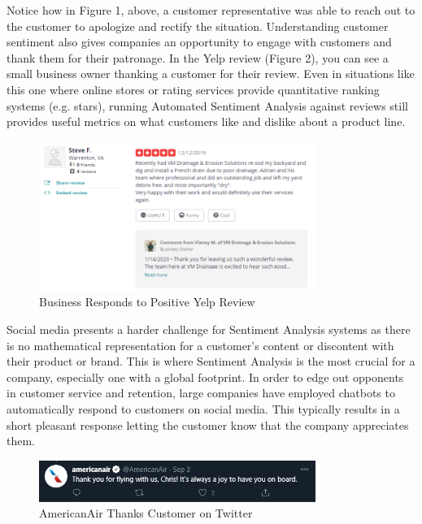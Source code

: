 \documentclass[conference]{IEEEtran}
\begin{document}
Notice how in Figure 1, above, a customer representative was able to reach out to the customer to apologize and rectify the situation. Understanding customer sentiment also gives companies an opportunity to engage with customers and thank them for their patronage. In the Yelp review (Figure 2), you can see a small business owner thanking a customer for their review.  Even in situations like this one where online stores or rating services provide quantitative ranking systems (e.g. stars), running Automated Sentiment Analysis against reviews still provides useful metrics on what customers like and dislike about a product line.\\

\begin{figure}[htbp]
\centerline{\includegraphics[width=9cm]{image 2.png}}
\caption{Business Responds to Positive Yelp Review}
\label{fig2}
\end{figure}

Social media presents a harder challenge for Sentiment Analysis systems as there is no mathematical representation for a customer’s content or discontent with their product or brand. This is where Sentiment Analysis is the most crucial for a company, especially one with a global footprint. In order to edge out opponents in customer service and retention, large companies have employed chatbots to automatically respond to customers on social media. This typically results in a short pleasant response letting the customer know that the company appreciates them.\\

\begin{figure}[htbp]
\centerline{\includegraphics[width=9cm]{image4.png}}
\caption{AmericanAir Thanks Customer on Twitter}
\label{fig3}
\end{figure}
\end{document}
